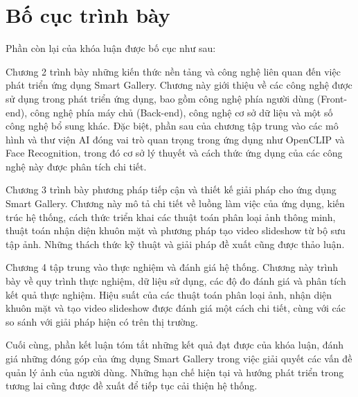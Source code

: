 \section{Bố cục trình bày}

Phần còn lại của khóa luận được bố cục như sau: 

Chương 2 trình bày những kiến thức nền tảng và công nghệ liên quan đến việc phát triển ứng dụng Smart Gallery. Chương này giới thiệu về các công nghệ được sử dụng trong phát triển ứng dụng, bao gồm công nghệ phía người dùng (Front-end), công nghệ phía máy chủ (Back-end), công nghệ cơ sở dữ liệu và một số công nghệ bổ sung khác. Đặc biệt, phần sau của chương tập trung vào các mô hình và thư viện AI đóng vai trò quan trọng trong ứng dụng như OpenCLIP và Face Recognition, trong đó cơ sở lý thuyết và cách thức ứng dụng của các công nghệ này được phân tích chi tiết.

Chương 3 trình bày phương pháp tiếp cận và thiết kế giải pháp cho ứng dụng Smart Gallery. Chương này mô tả chi tiết về luồng làm việc của ứng dụng, kiến trúc hệ thống, cách thức triển khai các thuật toán phân loại ảnh thông minh, thuật toán nhận diện khuôn mặt và phương pháp tạo video slideshow từ bộ sưu tập ảnh. Những thách thức kỹ thuật và giải pháp đề xuất cũng được thảo luận.

Chương 4 tập trung vào thực nghiệm và đánh giá hệ thống. Chương này trình bày về quy trình thực nghiệm, dữ liệu sử dụng, các độ đo đánh giá và phân tích kết quả thực nghiệm. Hiệu suất của các thuật toán phân loại ảnh, nhận diện khuôn mặt và tạo video slideshow được đánh giá một cách chi tiết, cùng với các so sánh với giải pháp hiện có trên thị trường.

Cuối cùng, phần kết luận tóm tắt những kết quả đạt được của khóa luận, đánh giá những đóng góp của ứng dụng Smart Gallery trong việc giải quyết các vấn đề quản lý ảnh của người dùng. Những hạn chế hiện tại và hướng phát triển trong tương lai cũng được đề xuất để tiếp tục cải thiện hệ thống.
